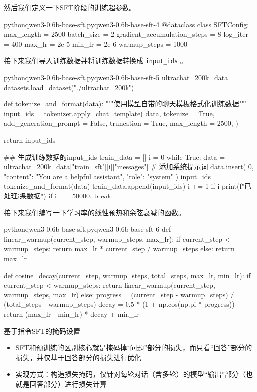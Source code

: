 \documentclass[lang=cn,newtx,10pt,scheme=chinese]{elegantbook}
\newcommand{\py}[1]{%
  \colorbox{gray!10}{\texttt{#1}}%
}
\begin{document}
然后我们定义一下SFT阶段的训练超参数。

\begin{codebox}{python}{qwen3-0.6b-base-sft.py}{qwen3-0.6b-base-sft-4}
@dataclass
class SFTConfig:
    max_length = 2500
    batch_size = 2
    gradient_accumulation_steps = 8
    log_iter = 400
    max_lr = 2e-5
    min_lr = 2e-6
    warmup_steps = 1000
\end{codebox}

接下来我们导入训练数据并将训练数据转换成\py{input_ids}。

\begin{codebox}{python}{qwen3-0.6b-base-sft.py}{qwen3-0.6b-base-sft-5}
ultrachat_200k_data = datasets.load_dataset("./ultrachat_200k")

def tokenize_and_format(data):
    """使用模型自带的聊天模板格式化训练数据"""
    input_ids = tokenizer.apply_chat_template(
        data,
        tokenize = True,
        add_generation_prompt = False,
        truncation = True,
        max_length = 2500,
    )
    
    return input_ids

## 生成训练数据的input_ids
train_data = []
i = 0
while True:
    data = ultrachat_200k_data["train_sft"][i]["messages"]
    # 添加系统提示词
    data.insert(
        0,
        {"content": "You are a helpful assistant", "role": "system"}
    )
    input_ids = tokenize_and_format(data)
    train_data.append(input_ids)
    i += 1
    if i %
        print(f"已处理{i}条数据")
    if i == 50000:
        break
\end{codebox}

接下来我们编写一下学习率的线性预热和余弦衰减的函数。

\begin{codebox}{python}{qwen3-0.6b-base-sft.py}{qwen3-0.6b-base-sft-6}
def linear_warmup(current_step, warmup_steps, max_lr):
    if current_step < warmup_steps:
        return max_lr * current_step / warmup_steps
    else:
        return max_lr

def cosine_decay(current_step, warmup_steps, total_steps, max_lr, min_lr):
    if current_step < warmup_steps:
        return linear_warmup(current_step, warmup_steps, max_lr)
    else:
        progress = (current_step - warmup_steps) / (total_steps - warmup_steps)
        decay = 0.5 * (1 + np.cos(np.pi * progress))
        return (max_lr - min_lr) * decay + min_lr
\end{codebox}

\begin{marker}
基于指令SFT的掩码设置
\begin{itemize}
\item SFT和预训练的区别核心就是掩码掉``问题''部分的损失，而只看``回答''部分的损失，并仅基于回答部分的损失进行优化
\item 实现方式：构造损失掩码，仅针对每轮对话（含多轮）的模型``输出''部分（也就是回答部分）进行损失计算
\end{itemize}
\end{marker}
\end{document}
